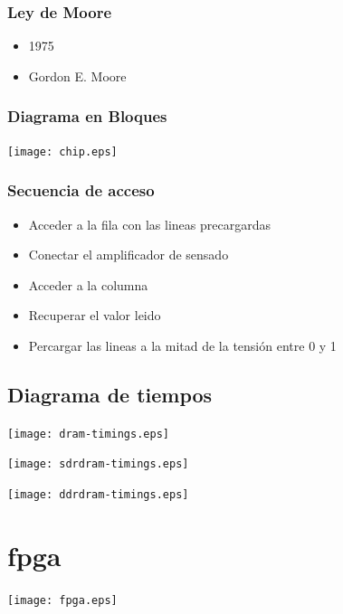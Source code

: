 \documentclass{beamer}
\begin{document}
\begin{frame}
\frametitle{Ley de Moore}
	\begin{itemize}
		\item 1975
		\item Gordon E. Moore
	\end{itemize}
\end{frame}

\begin{frame}
\frametitle{Diagrama en Bloques}
	\begin{center}
		\texttt{[image: chip.eps]}
	\end{center}
\end{frame}

\begin{frame}
\frametitle{Secuencia de acceso}
	\begin{itemize}
		\item Acceder a la fila con las lineas precargardas
		\item Conectar el amplificador de sensado
		\item Acceder a la columna
		\item Recuperar el valor leido
		\item Percargar las lineas a la mitad de la tensión entre 0 y 1
	\end{itemize}
\end{frame}

\subsection{Diagrama de tiempos}
\begin{frame}
	\begin{center}
		\texttt{[image: dram-timings.eps]}
	\end{center}
\end{frame}

\begin{frame}
	\begin{center}
		\texttt{[image: sdrdram-timings.eps]}
	\end{center}
\end{frame}

\begin{frame}
	\begin{center}
		\texttt{[image: ddrdram-timings.eps]}
	\end{center}
\end{frame}

\section{fpga}
\begin{frame}
	\begin{center}
		\texttt{[image: fpga.eps]}
	\end{center}
\end{frame}
\end{document}
